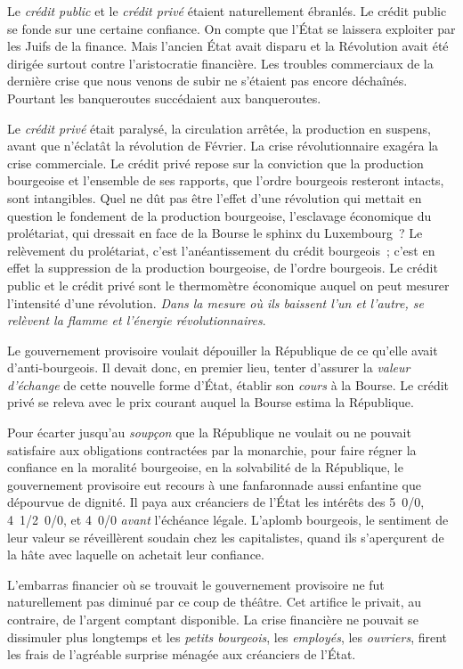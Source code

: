 \documentclass[twoside]{book} %
\begin{document}
Le \emph{crédit public} et le \emph{crédit privé} étaient naturellement ébranlés. Le crédit public se fonde sur une certaine confiance. On compte que l’État se laissera exploiter par les Juifs de la finance. Mais l’ancien État avait disparu et la Révolution avait été dirigée surtout contre l’aristocratie financière. Les troubles commerciaux de la dernière crise que nous venons de subir ne s’étaient pas encore déchaînés. Pourtant les banqueroutes succédaient aux banqueroutes.\par
Le \emph{crédit privé} était paralysé, la circulation arrêtée, la production en suspens, avant que n’éclatât la révolution de Février. La crise révolutionnaire exagéra la crise commerciale. Le crédit privé repose sur la conviction que la production bourgeoise et l’ensemble de ses rapports, que l’ordre bourgeois resteront intacts, sont intangibles. Quel ne dût pas être l’effet d’une révolution qui mettait en question le fondement de la production bourgeoise, l’esclavage économique du prolétariat, qui dressait en face de la Bourse le sphinx du Luxembourg ? Le relèvement du prolétariat, c’est l’anéantissement du crédit bourgeois ; c’est en effet la suppression de la production bourgeoise, de l’ordre bourgeois. Le crédit public et le crédit privé sont le thermomètre économique auquel on peut mesurer l’intensité d’une révolution. \emph{Dans la mesure où ils baissent l’un et l’autre, se relèvent la flamme et l’énergie révolutionnaires}.\par
Le gouvernement provisoire voulait dépouiller la République de ce qu’elle avait d’anti-bourgeois. Il devait donc, en premier lieu, tenter d’assurer la \emph{valeur d’échange} de cette nouvelle forme d’État, établir son \emph{cours} à la Bourse. Le crédit privé se releva avec le prix courant auquel la Bourse estima la République.\par
Pour écarter jusqu’au \emph{soupçon} que la République ne voulait ou ne pouvait satisfaire aux obligations contractées par la monarchie, pour faire régner la confiance en la moralité bourgeoise, en la solvabilité de la République, le gouvernement provisoire eut recours à une fanfaronnade aussi enfantine que dépourvue de dignité. Il paya aux créanciers de l’État les intérêts des 5 0/0, 4 1/2 0/0, et 4 0/0 \emph{avant} l’échéance légale. L’aplomb bourgeois, le sentiment de leur valeur se réveillèrent soudain chez les capitalistes, quand ils s’aperçurent de la hâte avec laquelle on achetait leur confiance.\par
L’embarras financier où se trouvait le gouvernement provisoire ne fut naturellement pas diminué par ce coup de théâtre. Cet artifice le privait, au contraire, de l’argent comptant disponible. La crise financière ne pouvait se dissimuler plus longtemps et les \emph{petits bourgeois}, les \emph{employés}, les \emph{ouvriers}, firent les frais de l’agréable surprise ménagée aux créanciers de l’État.\par
\end{document}

